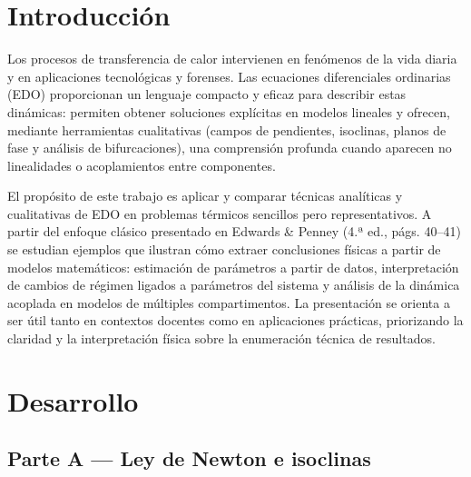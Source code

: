 \documentclass[a4paper,10pt]{article}
\begin{document}
\section{Introducción}\label{sec:intro}
	Los procesos de transferencia de calor intervienen en fenómenos de la vida
	diaria y en aplicaciones tecnológicas y forenses. Las ecuaciones diferenciales
	ordinarias (EDO) proporcionan un lenguaje compacto y eficaz para describir
	estas dinámicas: permiten obtener soluciones explícitas en modelos lineales y
	ofrecen, mediante herramientas cualitativas (campos de pendientes, isoclinas,
	planos de fase y análisis de bifurcaciones), una comprensión profunda cuando
	aparecen no linealidades o acoplamientos entre componentes.

	El propósito de este trabajo es aplicar y comparar técnicas analíticas y
	cualitativas de EDO en problemas térmicos sencillos pero representativos. A
	partir del enfoque clásico presentado en Edwards \& Penney (4.ª ed., págs.
	40--41) se estudian ejemplos que ilustran cómo extraer conclusiones físicas a
	partir de modelos matemáticos: estimación de parámetros a partir de datos,
	interpretación de cambios de régimen ligados a parámetros del sistema y
	análisis de la dinámica acoplada en modelos de múltiples compartimentos. La
	presentación se orienta a ser útil tanto en contextos docentes como en
	aplicaciones prácticas, priorizando la claridad y la interpretación física
	sobre la enumeración técnica de resultados.




\section{Desarrollo}\label{sec:dev}
	\subsection{Parte A --- Ley de Newton e isoclinas}\label{sub:parteA}
\end{document}
